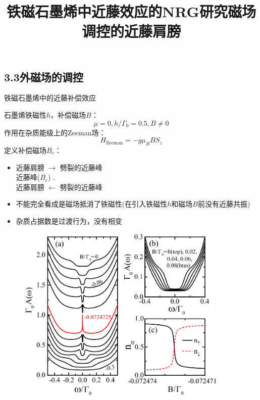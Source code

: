 \documentclass[9pt,t]{beamer} %
\begin{document}
\subsection{3.3外磁场的调控}
\title{铁磁石墨烯中近藤效应的NRG研究\qquad \qquad \qquad \qquad 磁场调控的近藤肩膀}
\begin{frame}{铁磁石墨烯中的近藤补偿效应}
\vspace{0.5cm}
\begin{minipage}[t]{0.55 \textwidth}
石墨烯铁磁性$h$，补偿磁场$B$：
\[\mu=0, h/\Gamma_{0}= 0.5, B\neq 0\]
作用在杂质能级上的Zeeman场：
\begin{equation}\nonumber
H_{\mathrm{Zeeman}}=-g \mu_{B} B S_{z}
\end{equation}
定义补偿磁场$B_{c}$：\\
\vspace{-0.5cm}
\vspace{0.2cm}
\begin{itemize}
\item 近藤肩膀 $\rightarrow$ 劈裂的近藤峰  \\
\hfill{近藤峰($B_{c}$) \hspace{1cm}}.\\
近藤肩膀 $\leftarrow$ 劈裂的近藤峰 
\item 不能完全看成是磁场抵消了铁磁性(在引入铁磁性$h$和磁场$B$前没有近藤共振)
\item 杂质占据数是过渡行为，没有相变
\end{itemize}
\end{minipage}%
\begin{minipage}[t]{0.55 \textwidth}
\begin{figure}
\hspace{-1.2cm}
\includegraphics[width=0.9\textwidth]{fig5.png}
\end{figure}
\end{minipage}
\vspace{0.12cm}
\end{frame}
\end{document}
